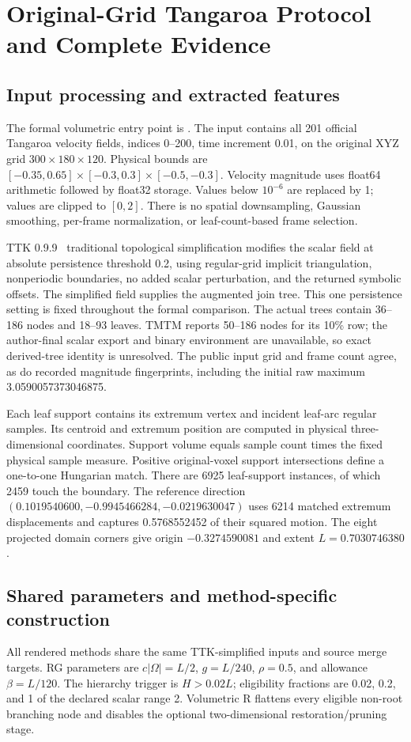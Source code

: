 \section{Original-Grid Tangaroa Protocol and Complete Evidence}
\subsection{Input processing and extracted features}
The formal volumetric entry point is . The input contains all 201 official Tangaroa velocity fields, indices 0--200, time increment 0.01, on the original XYZ grid $300\times180\times120$. Physical bounds are $[-0.35,0.65]\times[-0.3,0.3]\times[-0.5,-0.3]$. Velocity magnitude uses float64 arithmetic followed by float32 storage. Values below $10^{-6}$ are replaced by 1; values are clipped to $[0,2]$. There is no spatial downsampling, Gaussian smoothing, per-frame normalization, or leaf-count-based frame selection.

TTK 0.9.9~\cite{Tierny:2018:TTK} traditional topological simplification modifies the scalar field at absolute persistence threshold 0.2, using regular-grid implicit triangulation, nonperiodic boundaries, no added scalar perturbation, and the returned symbolic offsets. The simplified field supplies the augmented join tree. This one persistence setting is fixed throughout the formal comparison. The actual trees contain 36--186 nodes and 18--93 leaves. TMTM reports 50--186 nodes for its 10\% row; the author-final scalar export and binary environment are unavailable, so exact derived-tree identity is unresolved. The public input grid and frame count agree, as do recorded magnitude fingerprints, including the initial raw maximum 3.0590057373046875.

Each leaf support contains its extremum vertex and incident leaf-arc regular samples. Its centroid and extremum position are computed in physical three-dimensional coordinates. Support volume equals sample count times the fixed physical sample measure. Positive original-voxel support intersections define a one-to-one Hungarian match. There are 6925 leaf-support instances, of which 2459 touch the boundary. The reference direction $(0.1019540600,-0.9945466284,-0.0219630047)$ uses 6214 matched extremum displacements and captures 0.5768552452 of their squared motion. The eight projected domain corners give origin $-0.3274590081$ and extent $L=0.7030746380$.

\subsection{Shared parameters and method-specific construction}
All rendered methods share the same TTK-simplified inputs and source merge targets. RG parameters are $c|\Omega|=L/2$, $g=L/240$, $\rho=0.5$, and allowance $\beta=L/120$. The hierarchy trigger is $H>0.02L$; eligibility fractions are 0.02, 0.2, and 1 of the declared scalar range 2. Volumetric R flattens every eligible non-root branching node and disables the optional two-dimensional restoration/pruning stage.

